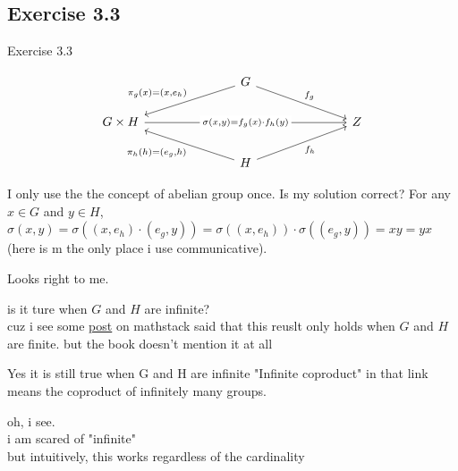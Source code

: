 \documentclass[15pt]{scrartcl}
\begin{document}
\subsection{Exercise 3.3}
\begin{discussion*}Exercise 3.3
    \begin{abboy*}
        \[\begin{tikzcd}
            &&& G \\
            {G\times H} &&&&&& Z \\
            &&& H
            \arrow["{\pi_g(x)=(x,e_h)}"', from=1-4, to=2-1]
            \arrow["{f_g}", from=1-4, to=2-7]
            \arrow["{\sigma(x,y)=f_g(x)\cdot f_h(y)}"{description}, from=2-1, to=2-7]
            \arrow["{\pi_h(h)=(e_g,h)}", from=3-4, to=2-1]
            \arrow["{f_h}"', from=3-4, to=2-7]
        \end{tikzcd}\]

        I only use the the concept of abelian group once. Is my solution correct? 
        For any $x\in G$ and $y\in H$, $\sigma(x,y)=\sigma((x,e_h)\cdot(e_g,y))=\sigma((x,e_h))\cdot
        \sigma((e_g,y))=xy=yx$ (here is m the only place i use communicative).
    \end{abboy*}
    \begin{evie*}
        Looks right to me.
    \end{evie*}
    \begin{abboy*}
        is it ture when $G$ and $H$ are infinite?
        \\
        cuz i see some \href{https://math.stackexchange.com/questions/243791/coproducts-in-textab}{post} on mathstack said that this reuslt only holds when $G$ and $H$ are finite. but the book doesn't mention it at all
        \\
        
    \end{abboy*}
    \begin{evie*}
        Yes it is still true when G and H are infinite
        "Infinite coproduct" in that link means the coproduct of infinitely many groups.
    \end{evie*}
    \begin{abboy*}
        oh, i see.
        \\
        i am scared of "infinite"
        \\
        but intuitively, this works regardless of the cardinality
    \end{abboy*}
\end{discussion*}
\end{document}
